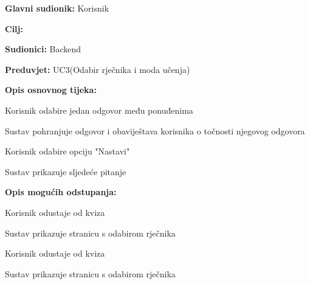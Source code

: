 					\noindent {}
					\begin{packed_item}
						
						\item \textbf{Glavni sudionik: } Korisnik
						\item  \textbf{Cilj:} 
						\item  \textbf{Sudionici:} Backend
						\item  \textbf{Preduvjet:} UC3(Odabir rječnika i moda učenja)
						\item  \textbf{Opis osnovnog tijeka:}
						
						\item[] \begin{packed_enum}
							
							\item Korisnik odabire jedan odgovor među ponuđenima
							\item Sustav pohranjuje odgovor i obaviještava korisnika o točnosti njegovog odgovora
							\item Korisnik odabire opciju "Nastavi"
							\item Sustav prikazuje sljedeće pitanje
						\end{packed_enum}
						
						\item  \textbf{Opis mogućih odstupanja:}
						
						\item[] \begin{packed_item}
							
							\item[3.a] Korisnik odustaje od kviza
							\item[] \begin{packed_enum}
								
								\item Sustav prikazuje stranicu s odabirom rječnika
								
							\end{packed_enum}
							
							\item[4.a] Korisnik odustaje od kviza 
							\item[] \begin{packed_enum}
								
								\item Sustav prikazuje stranicu s odabirom rječnika
								
							\end{packed_enum}
							
						\end{packed_item}
					\end{packed_item}
					
